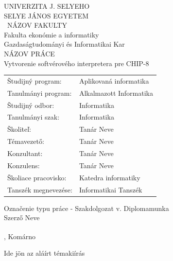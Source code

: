 \documentclass[a4paper,oneside,onecolumn,12pt]{LegrandOrangeBook}
\begin{document}
\begingroup
\makeatletter
\let\ps@plain\ps@empty
\begin{minipage}[c][\textheight][c]{\textwidth}
	{
        \centering
	    {\large UNIVERZITA J. SELYEHO\\SELYE JÁNOS EGYETEM} \\
	    \vskip0.5cm
        {\ NÁZOV FAKULTY\\Fakulta ekonómie a informatiky\\Gazdaságtudományi és Informatikai Kar} \\
        \vfill
        {\Large NÁZOV PRÁCE\\Vytvorenie softvérového interpretera pre CHIP-8 } \\
        \vfill
        \thispagestyle{empty}
        \begin{tabular}{ll}
            Študijný program:    & Aplikovaná informatika \\
            Tanulmányi program:  & Alkalmazott Informatika \\
            Študijný odbor:      & Informatika \\
            Tanulmányi szak:     & Informatika \\
            Školiteľ:            & Tanár Neve \\
            Témavezető:          & Tanár Neve \\
            Konzultant:          & Tanár Neve \\
            Konzulens:           & Tanár Neve \\
            Školiace pracovisko: & Katedra informatiky \\
            Tanszék megnevezése: & Informatikai Tanszék \\
        \end{tabular}
        \vfill
        Označenie typu práce - Szakdolgozat v. Diplomamunka \\
        Szerző Neve \\
        \ISBN \\
        \hfill\the\year{}, Komárno\hfill
	}
\end{minipage}
\endgroup

{
    \hspace*{-2cm}
    Ide jön az aláírt témakiírás
}

\tableofcontents
\pagebreak
\listoffigures
{}
\pagebreak

\end{document}
